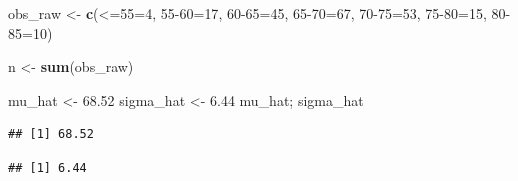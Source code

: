 \documentclass[
]{article}
\newenvironment{Shaded}{\begin{snugshade}}{\end{snugshade}}
\newcommand{\AttributeTok}[1]{\textcolor[rgb]{0.13,0.29,0.53}{#1}}
\newcommand{\DecValTok}[1]{\textcolor[rgb]{0.00,0.00,0.81}{#1}}
\newcommand{\FloatTok}[1]{\textcolor[rgb]{0.00,0.00,0.81}{#1}}
\newcommand{\FunctionTok}[1]{\textcolor[rgb]{0.13,0.29,0.53}{\textbf{#1}}}
\newcommand{\NormalTok}[1]{#1}
\newcommand{\OtherTok}[1]{\textcolor[rgb]{0.56,0.35,0.01}{#1}}
\newcommand{\StringTok}[1]{\textcolor[rgb]{0.31,0.60,0.02}{#1}}
\begin{document}
\begin{Shaded}
\begin{Highlighting}[]
\NormalTok{obs\_raw }\OtherTok{\textless{}{-}} \FunctionTok{c}\NormalTok{(}\StringTok{\textasciigrave{}}\AttributeTok{\textless{}=55}\StringTok{\textasciigrave{}}\OtherTok{=}\DecValTok{4}\NormalTok{, }\StringTok{\textasciigrave{}}\AttributeTok{55{-}60}\StringTok{\textasciigrave{}}\OtherTok{=}\DecValTok{17}\NormalTok{, }\StringTok{\textasciigrave{}}\AttributeTok{60{-}65}\StringTok{\textasciigrave{}}\OtherTok{=}\DecValTok{45}\NormalTok{, }\StringTok{\textasciigrave{}}\AttributeTok{65{-}70}\StringTok{\textasciigrave{}}\OtherTok{=}\DecValTok{67}\NormalTok{, }\StringTok{\textasciigrave{}}\AttributeTok{70{-}75}\StringTok{\textasciigrave{}}\OtherTok{=}\DecValTok{53}\NormalTok{, }\StringTok{\textasciigrave{}}\AttributeTok{75{-}80}\StringTok{\textasciigrave{}}\OtherTok{=}\DecValTok{15}\NormalTok{, }\StringTok{\textasciigrave{}}\AttributeTok{80{-}85}\StringTok{\textasciigrave{}}\OtherTok{=}\DecValTok{10}\NormalTok{)}

\NormalTok{n }\OtherTok{\textless{}{-}} \FunctionTok{sum}\NormalTok{(obs\_raw)}


\NormalTok{mu\_hat }\OtherTok{\textless{}{-}} \FloatTok{68.52}
\NormalTok{sigma\_hat }\OtherTok{\textless{}{-}} \FloatTok{6.44}
\NormalTok{mu\_hat; sigma\_hat}
\end{Highlighting}
\end{Shaded}

\begin{verbatim}
## [1] 68.52
\end{verbatim}

\begin{verbatim}
## [1] 6.44
\end{verbatim}
\end{document}
